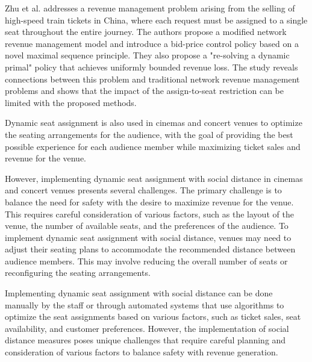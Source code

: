 
Zhu et al. \cite{zhu2023assign} addresses a revenue management problem arising from the selling of high-speed train tickets in China, where each request must be assigned to a single seat throughout the entire journey. The authors propose a modified network revenue management model and introduce a bid-price control policy based on a novel maximal sequence principle. They also propose a "re-solving a dynamic primal" policy that achieves uniformly bounded revenue loss. The study reveals connections between this problem and traditional network revenue management problems and shows that the impact of the assign-to-seat restriction can be limited with the proposed methods.

Dynamic seat assignment is also used in cinemas and concert venues to optimize the seating arrangements for the audience, with the goal of providing the best possible experience for each audience member while maximizing ticket sales and revenue for the venue.

However, implementing dynamic seat assignment with social distance in cinemas and concert venues presents several challenges. The primary challenge is to balance the need for safety with the desire to maximize revenue for the venue. This requires careful consideration of various factors, such as the layout of the venue, the number of available seats, and the preferences of the audience. To implement dynamic seat assignment with social distance, venues may need to adjust their seating plans to accommodate the recommended distance between audience members. This may involve reducing the overall number of seats or reconfiguring the seating arrangements.

Implementing dynamic seat assignment with social distance can be done manually by the staff or through automated systems that use algorithms to optimize the seat assignments based on various factors, such as ticket sales, seat availability, and customer preferences. However, the implementation of social distance measures poses unique challenges that require careful planning and consideration of various factors to balance safety with revenue generation.

